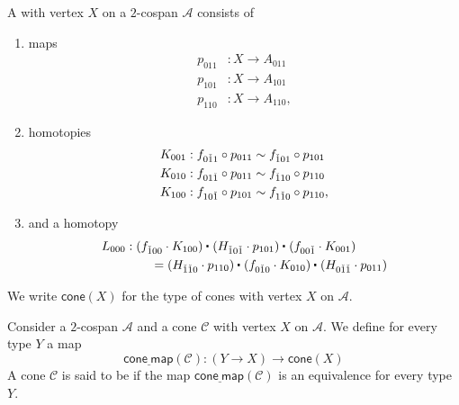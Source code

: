 \begin{defn}
A  with vertex $X$ on a $2$-cospan $\mathcal{A}$ consists of
\begin{enumerate}
\item maps
\begin{align*}
p_{011} & : X \to A_{011} \\
p_{101} & : X \to A_{101} \\
p_{110} & : X \to A_{110},
\end{align*}
\item homotopies
\begin{align*}
K_{001} & : f_{0\check{1}1}\circ p_{011} \sim f_{\check{1}01}\circ p_{101} \\
K_{010} & : f_{01\check{1}}\circ p_{011} \sim f_{\check{1}10}\circ p_{110} \\
K_{100} & : f_{10\check{1}}\circ p_{101} \sim f_{1\check{1}0}\circ p_{110},
\end{align*}
\item and a homotopy
\begin{align*}
L_{000} & : \ct{(f_{\check{1}00}\cdot K_{100})}{(H_{\check{1}0\check{1}}\cdot p_{101})}{(f_{00\check{1}}\cdot K_{001})} \\
& \qquad = \ct{(H_{\check{1}\check{1}0}\cdot p_{110})}{(f_{0\check{1}0}\cdot K_{010})}{(H_{0\check{1}\check{1}}\cdot p_{011})}
\end{align*}
\end{enumerate}
We write $\mathsf{cone}(X)$ for the type of cones with vertex $X$ on $\mathcal{A}$.
\end{defn}

\begin{defn}
Consider a $2$-cospan $\mathcal{A}$ and a cone $\mathcal{C}$ with vertex $X$ on $\mathcal{A}$. We define for every type $Y$ a map
\begin{equation*}
\mathsf{cone\underline{~}map}(\mathcal{C}) : (Y\to X)\to \mathsf{cone}(X)
\end{equation*}
A cone $\mathcal{C}$ is said to be  if the map $\mathsf{cone\underline{~}map}(\mathcal{C})$ is an equivalence for every type $Y$.
\end{defn}

